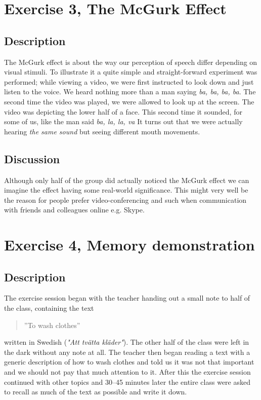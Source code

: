 \documentclass[10pt, a4paper]{article}
\begin{document}
\section{Exercise 3, The McGurk Effect}
\subsection{Description}
The McGurk effect is about the way our perception of speech differ depending on visual stimuli. To illustrate it a quite simple and straight-forward experiment was performed; while viewing a video, we were first instructed to look down and just listen to the voice. We heard nothing more than a man saying \emph{ba, ba, ba, ba}. The second time the video was played, we were allowed to look up at the screen. The video was depicting the lower half of a face.  This second time it sounded, for some of us, like the man said \emph{ba, la, la, va} It turns out that we were actually hearing \emph{the same sound} but seeing different mouth movements.

\subsection{Discussion}
Although only half of the group did actually noticed the McGurk effect we can imagine the effect having some real-world significance. This might very well be the reason for people prefer video-conferencing and such when communication with friends and colleagues online e.g. Skype.

\section{Exercise 4, Memory demonstration}
\subsection{Description}
The exercise session began with the teacher handing out a small note to half of the class, containing the text \begin{quote}''To wash clothes''\end{quote} written in Swedish (\emph{"Att tvätta kläder"}). The other half of the class were left in the dark without any note at all. The teacher then began reading a text with a generic description of how to wash clothes and told us it was not that important and we should not pay that much attention to it. After this the exercise session continued with other topics and 30--45 minutes later the entire class were asked to recall as much of the text as possible and write it down.
\end{document}
